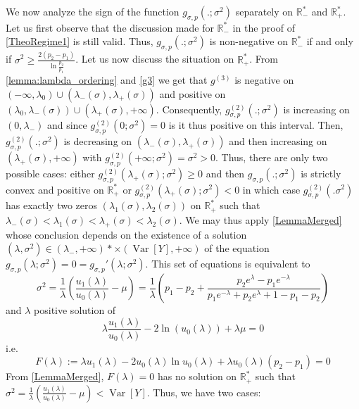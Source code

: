 \documentclass[a4paper, 10pt]{article}
\newcommand{\beq}{\begin{equation}}
\newcommand{\eeq}{\end{equation}}
\theoremstyle{definition}
\begin{document}
We now analyze the sign of the function  $g_{\sigma, p}(.;\sigma^2)$  separately  on $\mathbb{R}_-^*$ and $\mathbb{R}_+^*$. Let us first observe that the discussion made for $\mathbb{R}_-^*$ in the proof of \autoref{TheoRegime1} is still valid. Thus, $g_{\sigma, p}(.;\sigma^2)$ is non-negative on $\mathbb{R}_-^*$ if and only if $\sigma^2\geq \frac{2(p_2-p_1)}{\ln \frac{p_2}{p_1}}$. Let us now discuss the situation on $\mathbb{R}_+^*$. From \autoref{lemma:lambda_ordering} and \eqref{g3} we get that $g^{(3)}$ is negative on $(-\infty,\lambda_0)\cup\left(\lambda_-(\sigma),\lambda_+(\sigma)\right)$  and positive on $(\lambda_0,\lambda_-(\sigma))\cup\left(\lambda_+(\sigma),+\infty\right)$. Consequently, $g^{(2)}_{\sigma, p}(.;\sigma^2)$ is increasing on $(0,\lambda_-)$ and since $g^{(2)}_{\sigma, p}(0;\sigma^2)=0$ is it thus positive on this interval. Then, $g_{\sigma, p}^{(2)}(.;\sigma^2)$ is decreasing on $(\lambda_-(\sigma),\lambda_+(\sigma))$ and then increasing on $(\lambda_+(\sigma),+\infty)$ with $g_{\sigma, p}^{(2)}(+\infty;\sigma^2)=\sigma^2>0$. Thus, there are only two possible cases: either $g_{\sigma, p}^{(2)}(\lambda_+(\sigma);\sigma^2)\geq 0$ and then $g_{\sigma, p}(.;\sigma^2)$ is strictly convex and positive on $\mathbb{R}_+^*$ or $g^{(2)}_{\sigma, p}(\lambda_+(\sigma);\sigma^2)<0$ in which case $g_{\sigma, p}^{(2)}(.\sigma^2)$ has exactly two zeros $(\lambda_1(\sigma),\lambda_2(\sigma))$ on $\mathbb{R}_+^*$ such that $\lambda_-(\sigma)<\lambda_1(\sigma)<\lambda_+(\sigma)<\lambda_2(\sigma)$. We may thus apply \autoref{LemmaMerged} whose conclusion depends on the existence of a solution $(\lambda,\sigma^2)\in \left(\lambda_-,+\infty\right)*\times \left(\operatorname{Var}[Y],+\infty\right)$ of the equation $g_{\sigma, p}(\lambda;\sigma^2)=0=g_{\sigma, p}'(\lambda;\sigma^2)$. This set of equations is equivalent to
\beq \sigma^2=\frac{1}{\lambda}\left(\frac{u_1(\lambda)}{u_0(\lambda)}-\mu\right)=\frac{1}{\lambda}\left(p_1-p_2+\frac{p_2e^\lambda-p_1e^{-\lambda}}{p_1e^{-\lambda}+p_2e^{\lambda}+1-p_1-p_2}\right)
\eeq
and $\lambda$ positive solution of
\beq \lambda \frac{u_1(\lambda)}{u_0(\lambda)}- 2\ln (u_0(\lambda))+\lambda \mu=0\eeq
i.e.
\beq \label{EqF} F(\lambda):=\lambda u_1(\lambda)-2u_0(\lambda)\ln u_0(\lambda)+ \lambda u_0(\lambda)(p_2-p_1)=0\eeq
From \autoref{LemmaMerged}, $F(\lambda)=0$ has no solution on $\mathbb{R}_+^*$ such that $\sigma^2=\frac{1}{\lambda}\left(\frac{u_1(\lambda)}{u_0(\lambda)}-\mu\right)<\operatorname{Var}[Y]$. Thus, we have two cases:
\end{document}
